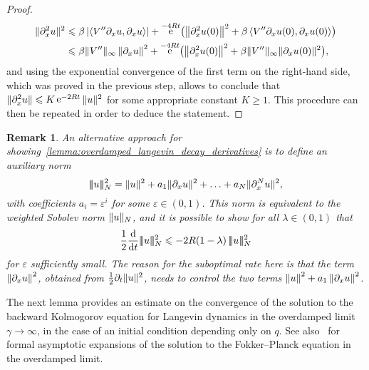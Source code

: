 \documentclass[11pt,a4paper]{article}
\DeclareMathOperator{\e}{e}
\theoremstyle{plain}
\newtheorem{remark}{Remark}[section]
\numberwithin{equation}{section}
\renewcommand{\leq}{\leqslant}
\renewcommand{\geq}{\geqslant}
\begin{document}
\begin{proof}
    \begin{align*}
        \norm*{\partial_x^2 u}^2
        &\leq \beta \abs{\ip{V'' \partial_x u}{\partial_x u}} + \e^{-4Rt} \bigl( \norm{\partial_x^2 u(0)}^2 + \beta \ip{V'' \partial_x u(0)}{\partial_x u(0)} \bigr) \\
        &\leq \beta \norm*{V''}_{\infty} \norm{\partial_x u}^2 + \e^{-4Rt} \bigl( \norm{\partial_x^2 u(0)}^2 + \beta \norm*{V''}_{\infty} \norm*{\partial_x u(0)}^2 \bigr),
    \end{align*}
    and using the exponential convergence of the first term on the right-hand side,
    which was proved in the previous step,
    allows to conclude that $\norm*{\partial_x^2 u} \leq K \e^{-2 Rt} \norm*{u}^2$ for some appropriate constant $K \geq 1$.
    This procedure can then be repeated in order to deduce the statement.
\end{proof}

\newcommand{\auxnorm}[1]{|\!|\!| #1 |\!|\!|}
\begin{remark}
    An alternative approach for showing~\cref{lemma:overdamped_langevin_decay_derivatives} is
    to define an auxiliary norm
    \[
        \auxnorm{u}_N^2 = \norm*{u}^2 + a_1 \norm*{\partial_x u}^2 + \dotsc + a_N \norm*{\partial_x^N u}^2,
    \]
    with coefficients $a_i = \varepsilon^i$ for some $\varepsilon \in (0, 1)$.
    This norm is equivalent to the weighted Sobolev norm $\norm*{u}_N$,
    and it is possible to show for all $\lambda \in (0, 1)$ that
    \[
        \frac{1}{2}\derivative*{1}{t} \auxnorm{u}_N^2 \leq - 2 R(1 - \lambda) \, \auxnorm{u}_N^2
    \]
    for $\varepsilon$ sufficiently small.
    The reason for the suboptimal rate here is that the term $\norm{\partial_x u}^2$,
    obtained from $\frac{1}{2} \partial_t \norm*{u}^2$,
    needs to control the two terms $\norm{u}^2 + a_1 \norm{\partial_x u}^2$.
\end{remark}


The next lemma provides an estimate on the convergence of the solution to the backward Kolmogorov equation for Langevin dynamics
in the overdamped limit $\gamma \to \infty$,
in the case of an initial condition depending only on $q$.
See also~\cite{MR496218,MR918689} for formal asymptotic expansions of the solution to the Fokker--Planck equation in the overdamped limit.
\end{document}
